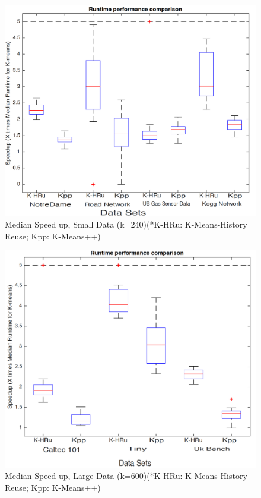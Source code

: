 \begin{figure}[t!]
    \includegraphics[width=\textwidth]{Chapter-5/figs/kpp+k_cust_speedup_small}
    \caption{Median Speed up, Small Data (k=240)(*K-HRu: K-Means-History Reuse; Kpp: K-Means++)}
    \centering
    \label{fig:box_speedup_small}
\end{figure}

\begin{figure}[b!]
    \centering
    \includegraphics[width=\textwidth]{Chapter-5/figs/kcust+kpp_speedup_large}
    \caption{Median Speed up, Large Data (k=600)(*K-HRu: K-Means-History Reuse; Kpp: K-Means++)}
    \label{fig:box_speedup_large}
\end{figure}


